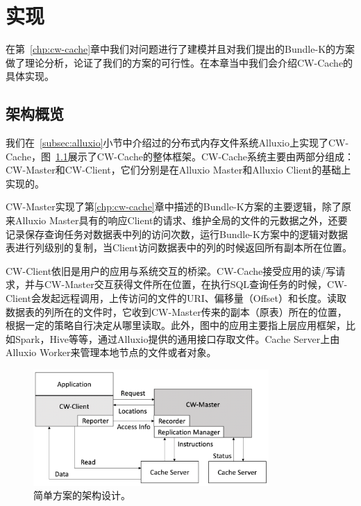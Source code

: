 \chapter{实现}
\label{chp:implementation}

\par 在第~\ref{chp:cw-cache}章中我们对问题进行了建模并且对我们提出的Bundle-K的方案做了理论分析，论证了我们的方案的可行性。在本章当中我们会介绍CW-Cache的具体实现。

\section{架构概览}
\label{sec:archi-overview}

\par 我们在~\ref{subsec:alluxio}小节中介绍过的分布式内存文件系统Alluxio上实现了CW-Cache，图~\ref{fig:cw-cache-archi}展示了CW-Cache的整体框架。CW-Cache系统主要由两部分组成：CW-Master和CW-Client，它们分别是在Alluxio Master和Alluxio Client的基础上实现的。

\par CW-Master实现了第\ref{chp:cw-cache}章中描述的Bundle-K方案的主要逻辑，除了原来Alluxio Master具有的响应Client的请求、维护全局的文件的元数据之外，还要记录保存查询任务对数据表中列的访问次数，运行Bundle-K方案中的逻辑对数据表进行列级别的复制，当Client访问数据表中的列的时候返回所有副本所在位置。

\par CW-Client依旧是用户的应用与系统交互的桥梁。CW-Cache接受应用的读/写请求，并与CW-Master交互获得文件所在位置，在执行SQL查询任务的时候，CW-Client会发起远程调用，上传访问的文件的URI、偏移量（Offset）和长度。读取数据表的列所在的文件时，它收到CW-Master传来的副本（原表）所在的位置，根据一定的策略自行决定从哪里读取。此外，图中的应用主要指上层应用框架，比如Spark，Hive等等，通过Alluxio提供的通用接口存取文件。Cache Server上由Alluxio Worker来管理本地节点的文件或者对象。

\begin{figure}[]
	\centering
	\includegraphics[width=0.8\textwidth]{img/implementation/cw-cache-archi}
	
	\caption{简单方案的架构设计。}
	\label{fig:cw-cache-archi}
\end{figure}

